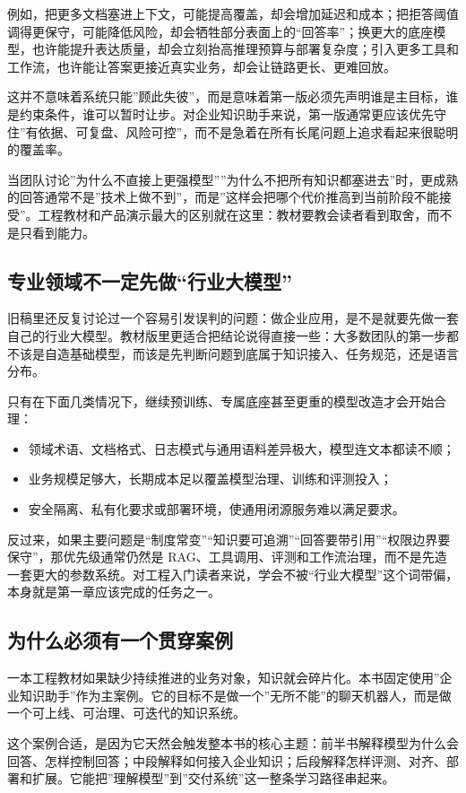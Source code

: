 例如，把更多文档塞进上下文，可能提高覆盖，却会增加延迟和成本；把拒答阈值调得更保守，可能降低风险，却会牺牲部分表面上的“回答率”；换更大的底座模型，也许能提升表达质量，却会立刻抬高推理预算与部署复杂度；引入更多工具和工作流，也许能让答案更接近真实业务，却会让链路更长、更难回放。

这并不意味着系统只能”顾此失彼”，而是意味着第一版必须先声明谁是主目标，谁是约束条件，谁可以暂时让步。对企业知识助手来说，第一版通常更应该优先守住”有依据、可复盘、风险可控”，而不是急着在所有长尾问题上追求看起来很聪明的覆盖率。

当团队讨论”为什么不直接上更强模型””为什么不把所有知识都塞进去”时，更成熟的回答通常不是”技术上做不到”，而是”这样会把哪个代价推高到当前阶段不能接受”。工程教材和产品演示最大的区别就在这里：教材要教会读者看到取舍，而不是只看到能力。

\subsection{专业领域不一定先做“行业大模型”}
旧稿里还反复讨论过一个容易引发误判的问题：做企业应用，是不是就要先做一套自己的行业大模型。教材版里更适合把结论说得直接一些：大多数团队的第一步都不该是自造基础模型，而该是先判断问题到底属于知识接入、任务规范，还是语言分布。

只有在下面几类情况下，继续预训练、专属底座甚至更重的模型改造才会开始合理：
\begin{itemize}
  \item 领域术语、文档格式、日志模式与通用语料差异极大，模型连文本都读不顺；
  \item 业务规模足够大，长期成本足以覆盖模型治理、训练和评测投入；
  \item 安全隔离、私有化要求或部署环境，使通用闭源服务难以满足要求。
\end{itemize}

反过来，如果主要问题是“制度常变”“知识要可追溯”“回答要带引用”“权限边界要保守”，那优先级通常仍然是 RAG、工具调用、评测和工作流治理，而不是先造一套更大的参数系统。对工程入门读者来说，学会不被“行业大模型”这个词带偏，本身就是第一章应该完成的任务之一。

\subsection{为什么必须有一个贯穿案例}
一本工程教材如果缺少持续推进的业务对象，知识就会碎片化。本书固定使用”企业知识助手”作为主案例。它的目标不是做一个”无所不能”的聊天机器人，而是做一个可上线、可治理、可迭代的知识系统。

这个案例合适，是因为它天然会触发整本书的核心主题：前半书解释模型为什么会回答、怎样控制回答；中段解释如何接入企业知识；后段解释怎样评测、对齐、部署和扩展。它能把”理解模型”到”交付系统”这一整条学习路径串起来。

